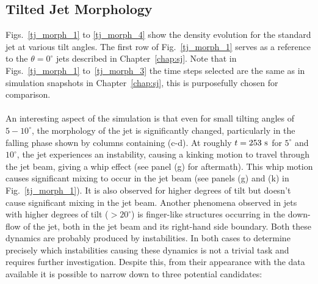 \documentclass[12pt]{ociamthesis}
\newcommand{\np}{\\ \\}
\newcommand{\degs}{^{\circ}}
\begin{document}
\subsection{Tilted Jet Morphology}
\label{subsec:steady}
Figs.~\ref{tj_morph_1} to \ref{tj_morph_4} show the density evolution for the standard jet at various tilt angles. The first row of Fig.~\ref{tj_morph_1} serves as a reference to the $\theta=0\degs$ jets described in Chapter~\ref{chap:sj}. Note that in Figs.~\ref{tj_morph_1} to~\ref{tj_morph_3} the time steps selected are the same as in simulation snapshots in Chapter~\ref{chap:sj}, this is purposefully chosen for comparison. \np
%
An interesting aspect of the simulation is that even for small tilting angles of $5-10^{\circ}$, the morphology of the jet is significantly changed, particularly in the falling phase shown by columns containing (c-d). At roughly $t=253~\rm{s}$ for $5^{\circ}$ and $10^{\circ}$, the jet experiences an instability, causing a kinking motion to travel through the jet beam, giving a whip effect (see panel (g) for aftermath). This whip motion causes significant mixing to occur in the jet beam (see panels (g) and (k) in Fig.~\ref{tj_morph_1}). It is also observed for higher degrees of tilt but doesn't cause significant mixing in the jet beam. Another phenomena observed in jets with higher degrees of tilt ($>20^{\circ}$) is finger-like structures occurring in the down-flow of the jet, both in the jet beam and its right-hand side boundary. Both these dynamics are probably produced by instabilities. In both cases to determine precisely which instabilities causing these dynamics is not a trivial task and requires further investigation. Despite this, from their appearance with the data available it is possible to narrow down to three potential candidates:
\end{document}
